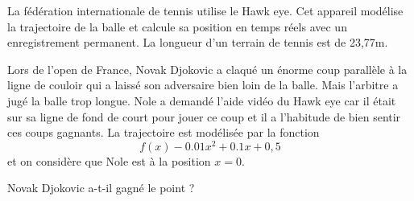 
La fédération internationale de tennis utilise le Hawk eye.  Cet appareil modélise la trajectoire de la balle et calcule sa position en temps réels avec un enregistrement permanent. La longueur d'un terrain de tennis est de 23,77m.

Lors de l'open de France, Novak Djokovic a claqué un énorme coup parallèle à la ligne de couloir qui a laissé son adversaire bien loin de la balle. Mais l'arbitre a jugé la balle trop longue. Nole a demandé l'aide vidéo du Hawk eye car il était sur sa ligne de fond de court pour jouer ce coup et il a l'habitude de bien sentir ces coups gagnants. La trajectoire est modélisée par la fonction $$f(x)-0.01x^2+0.1x+0,5$$ et on considère que Nole est à la position $x=0$.

Novak Djokovic a-t-il gagné le point ?